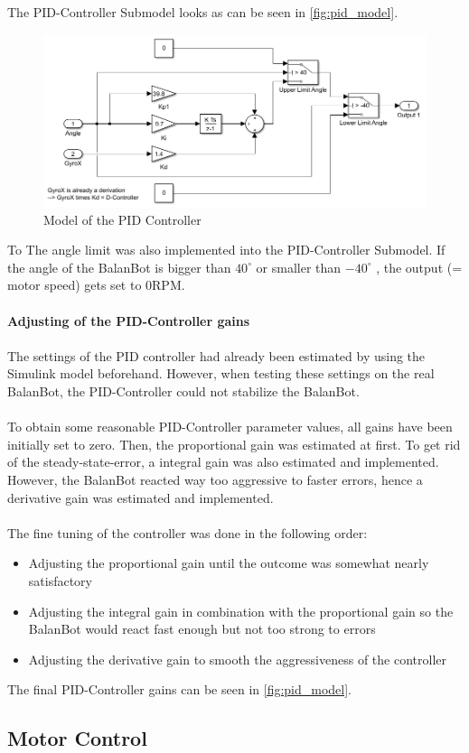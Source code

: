 The PID-Controller Submodel looks as can be seen in \autoref{fig:pid_model}.
\begin{figure}[H]
    \centering
    \includegraphics[width=\textwidth]{Lab_report/pics/hardware_impl/PID.PNG}
    \caption{Model of the PID Controller}
    \label{fig:pid_model}
\end{figure}
To 
The angle limit was also implemented into the PID-Controller Submodel. If the angle of the BalanBot is bigger than $40^\circ$ or smaller than $-40^\circ$ , the output (= motor speed) gets set to 0RPM.
\newline\\\\
\textbf{Adjusting of the PID-Controller gains}\\\\
The settings of the PID controller had already been estimated by using the Simulink model beforehand. However, when testing these settings on the real BalanBot, the PID-Controller could not stabilize the BalanBot.\\\\
To obtain some reasonable PID-Controller parameter values, all gains have been initially set to zero. Then, the proportional gain was estimated at first. To get rid of the steady-state-error, a integral gain was also estimated and implemented. However, the BalanBot reacted way too aggressive to faster errors, hence a derivative gain was estimated and implemented.\\\\
The fine tuning of the controller was done in the following order:
\begin{itemize}
    \item Adjusting the proportional gain until the outcome was somewhat nearly satisfactory
    \item Adjusting the integral gain in combination with the proportional gain so the BalanBot would react fast enough but not too strong to errors
    \item Adjusting the derivative gain to smooth the aggressiveness of the controller
\end{itemize}

The final PID-Controller gains can be seen in \autoref{fig:pid_model}.
\subsection{Motor Control}

